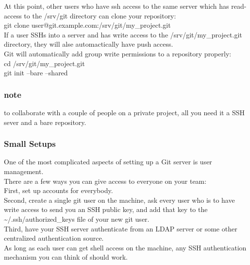 \documentclass[11pt]{article}
\begin{document}
At this point, other users who have ssh access to the same server which has read-access to the /srv/git directory can clone your repository:\\
git clone user@git.example.com:/srv/git/my\_project.git\\

If a user SSHs into a server and has write access to the /srv/git/my\_project.git directory, they will alse automactically have push access.\\

Git will automatically add group write permissions to a repository properly:\\
cd /srv/git/my\_project.git\\
git init --bare --shared\\

\subsubsection{note}
\label{sec:org5a86826}
to collaborate with a couple of people on a private project, all you need it a SSH sever and a bare repository.\\


\subsubsection{Small Setups}
\label{sec:org107ded2}
One of the most complicated aspects of setting up a Git server is user management.\\

There are a few ways you can give access to everyone on your team:\\
First, set up accounts for everybody.\\
Second, create a single git user on the machine, ask every user who is to have write access to send you an SSH public key, and add that key to the \textasciitilde{}/.ssh/authorized\_keys file of your new git user.\\
Third, have your SSH server authenticate from an LDAP server or some other centralized authentication source.\\

As long as each user can get shell access on the machine, any SSH authentication mechanism you can think of should work.\\
\end{document}
